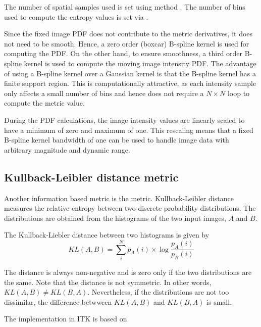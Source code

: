
The number of spatial samples used is set using method 
. The number of bins used to compute
the entropy values is set via .

Since the fixed image PDF does not contribute to the metric derivatives, it
does not need to be smooth. Hence, a zero order (boxcar) B-spline kernel is
used for computing the PDF. On the other hand, to ensure smoothness, a third
order B-spline kernel is used to compute the moving image intensity PDF. The
advantage of using a B-spline kernel over a Gaussian kernel is that the
B-spline kernel has a finite support region. This is computationally
attractive, as each intensity sample only affects a small number of bins and
hence does not require a $N \times N$ loop to compute the metric value.

During the PDF calculations, the image intensity values are linearly scaled
to have a minimum of zero and maximum of one. This rescaling means that a
fixed B-spline kernel bandwidth of one can be used to handle image data with
arbitrary magnitude and dynamic range.


\subsection{Kullback-Leibler distance metric}
Another information based metric is the  metric. Kullback-Leibler distance measures the relative entropy between two discrete 
probability distributions. The distributions are obtained from the histograms of the two 
input images, $A$ and $B$. 

The Kullback-Liebler distance between two histograms is given by
\begin{equation}
KL(A,B) =  \sum_i^N p_A(i) \times \log \frac{ p_A(i) }{p_B(i) }
\end{equation}

The distance is always non-negative and is zero only if the two distributions 
are the same. Note that the distance is not symmetric. In other 
words, $KL(A,B) \neq KL(B,A)$. Nevertheless, if the distributions are not too dissimilar, 
the difference betwween $KL(A,B)$ and $KL(B,A)$ is small.

The implementation in ITK is based on \cite{Chung2002}

